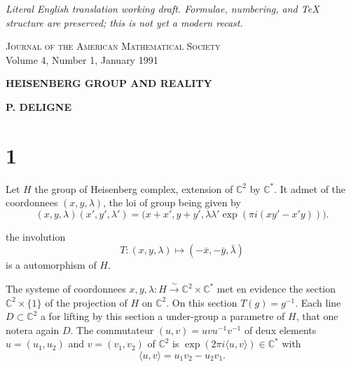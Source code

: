 \documentclass[12pt,a4paper]{article}
\theoremstyle{plain}
\theoremstyle{definition}
\theoremstyle{remark}
\begin{document}
\begin{center}\small\emph{Literal English translation working draft. Formulae, numbering, and TeX structure are preserved; this is not yet a modern recast.}\end{center}
\vspace{0.5em}


\begin{center}
\small\textsc{Journal of the American Mathematical Society}\\
\small Volume 4, Number 1, January 1991
\end{center}

\vspace{1em}

\begin{center}
\Large\textbf{HEISENBERG GROUP AND REALITY}
\end{center}

\begin{center}
\textbf{P. DELIGNE}
\end{center}

\vspace{1em}

\section*{1}

Let $H$ the group of Heisenberg complex, extension of $\mathbb{C}^2$ by $\mathbb{C}^*$. It admet of the coordonnees $(x, y, \lambda)$, the loi of group being given by
\begin{equation}\label{eq:1.1}
(x, y, \lambda)(x', y', \lambda') = \bigl(x + x', y + y', \lambda\lambda'\exp(\pi i(xy' - x'y))\bigr).\tag{1.1}
\end{equation}

the involution
\begin{equation}\label{eq:1.2}
T \colon (x, y, \lambda) \mapsto (-\bar{x}, -\bar{y}, \bar{\lambda})\tag{1.2}
\end{equation}
is a automorphism of $H$.

The systeme of coordonnees $x, y, \lambda \colon H \xrightarrow{\sim} \mathbb{C}^2 \times \mathbb{C}^*$ met en evidence the section $\mathbb{C}^2 \times \{1\}$ of the projection of $H$ on $\mathbb{C}^2$. On this section $T(g) = g^{-1}$. Each line $D \subset \mathbb{C}^2$ a for lifting by this section a under-group a parametre of $H$, that one notera again $D$. The commutateur $(u, v) = uvu^{-1}v^{-1}$ of deux elements $u = (u_1, u_2)$ and $v = (v_1, v_2)$ of $\mathbb{C}^2$ is $\exp(2\pi i\langle u, v \rangle) \in \mathbb{C}^*$ with
\begin{equation}\label{eq:1.3}
\langle u, v \rangle = u_1v_2 - u_2v_1.\tag{1.3}
\end{equation}
\end{document}
